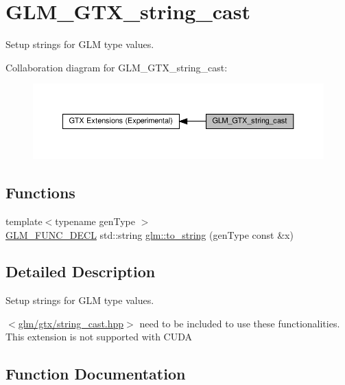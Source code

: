 \hypertarget{group__gtx__string__cast}{}\section{G\+L\+M\+\_\+\+G\+T\+X\+\_\+string\+\_\+cast}
\label{group__gtx__string__cast}


Setup strings for G\+LM type values.  


Collaboration diagram for G\+L\+M\+\_\+\+G\+T\+X\+\_\+string\+\_\+cast\+:\nopagebreak
\begin{figure}[H]
\begin{center}
\leavevmode
\includegraphics[width=350pt]{group__gtx__string__cast}
\end{center}
\end{figure}
\subsection*{Functions}
\begin{DoxyCompactItemize}
\item 
{\footnotesize template$<$typename gen\+Type $>$ }\\\hyperlink{setup_8hpp_ab2d052de21a70539923e9bcbf6e83a51}{G\+L\+M\+\_\+\+F\+U\+N\+C\+\_\+\+D\+E\+CL} std\+::string \hyperlink{group__gtx__string__cast_ga8f0dced1fd45e67e2d77e80ab93c7af5}{glm\+::to\+\_\+string} (gen\+Type const \&x)
\end{DoxyCompactItemize}


\subsection{Detailed Description}
Setup strings for G\+LM type values. 

$<$\hyperlink{string__cast_8hpp}{glm/gtx/string\+\_\+cast.\+hpp}$>$ need to be included to use these functionalities. This extension is not supported with C\+U\+DA 

\subsection{Function Documentation}
\mbox{\label{group__gtx__string__cast_ga8f0dced1fd45e67e2d77e80ab93c7af5}} 
